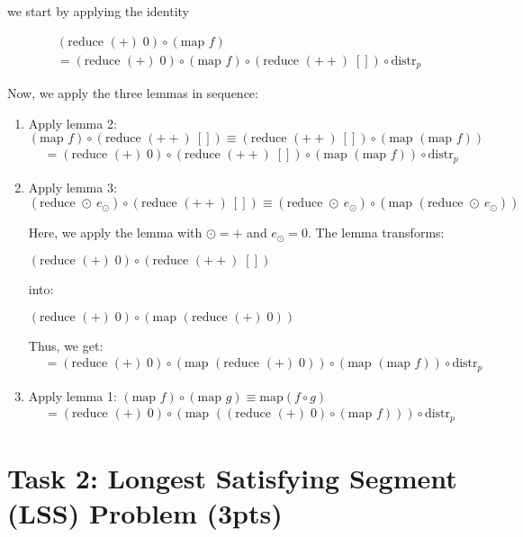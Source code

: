 \documentclass{article}
\begin{document}
we start by applying the identity

\begin{align*}
    & (\text{reduce } (+) \; 0) \circ (\text{map } f) \\
    &= (\text{reduce } (+) \; 0) \circ (\text{map } f) \circ  (\text{reduce } (++) \; []) \circ \text{distr}_p
    \end{align*}

Now, we apply the three lemmas in sequence:

\begin{enumerate}
    \item Apply lemma 2: $(\text{map } f) \circ (\text{reduce } (++)\ []) \equiv (\text{reduce } (++)\ []) \circ (\text{map } (\text{map } f))$
    \begin{align*}
    &= (\text{reduce } (+) \; 0) \circ (\text{reduce } (++) \; []) \circ (\text{map } (\text{map } f)) \circ \text{distr}_p
    \end{align*}

    \item Apply lemma 3: $(\text{reduce } \odot\ e_\odot) \circ (\text{reduce } (++)\ []) \equiv (\text{reduce } \odot\ e_\odot) \circ (\text{map } (\text{reduce } \odot\ e_\odot))$
    
    Here, we apply the lemma with $\odot = +$ and $e_\odot = 0$. The lemma transforms:
    
    $(\text{reduce } (+) \; 0) \circ (\text{reduce } (++) \; [])$
    
    into:
    
    $(\text{reduce } (+) \; 0) \circ (\text{map } (\text{reduce } (+) \; 0))$
    
    Thus, we get:
    \begin{align*}
    &= (\text{reduce } (+) \; 0) \circ (\text{map } (\text{reduce } (+) \; 0)) \circ (\text{map } (\text{map } f)) \circ \text{distr}_p
    \end{align*}

    \item Apply lemma 1: $(\text{map } f) \circ (\text{map } g) \equiv \text{map}(f \circ g)$
    \begin{align*}
    &= (\text{reduce } (+) \; 0) \circ (\text{map } ((\text{reduce } (+) \; 0) \circ (\text{map } f))) \circ \text{distr}_p
    \end{align*}
\end{enumerate}



\section{Task 2: Longest Satisfying Segment (LSS) Problem (3pts)}
\end{document}
